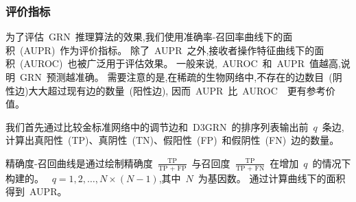 \begin{table}[!htbp]
\centering
\caption{实验数据集详情}

\label{datasets}
\end{table}

\subsubsection{评价指标}

为了评估~GRN~推理算法的效果,我们使用准确率-召回率曲线下的面积~(AUPR)~作为评价指标。
除了~AUPR~之外,接收者操作特征曲线下的面积~(AUROC)~也被广泛用于评估效果。
一般来说,~AUROC~和~AUPR~值越高,说明~GRN~预测越准确。
需要注意的是,在稀疏的生物网络中,不存在的边数目~(阴性边)大大超过现有边的数量~(阳性边),
因而~AUPR~比~AUROC~\cite{saito2015precision}~更有参考价值。

我们首先通过比较金标准网络中的调节边和~D3GRN~的排序列表输出前~$q$~条边,
计算出真阳性~(TP)、真阴性~(TN)、假阳性~(FP)~和假阴性~(FN)~边的数量。

精确度-召回曲线是通过绘制精确度~$\frac{\text{TP}}{\text{TP + FP}}$~与召回度~$\frac{\text{TP}}{\text{TP + FN}}$~在增加~$q$~的情况下构建的。
~$q = 1,2,\ldots,N\times(N-1)$,其中~$N$~为基因数。
通过计算曲线下的面积得到~AUPR。


